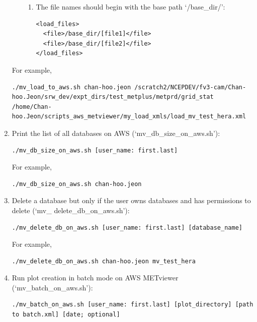 \documentclass[11pt,fleqn]{report}              %
\begin{document}
\begin{enumerate}
\begin{itemize}
\begin{enumerate}
\item The file names should begin with the base path `/base\_dir/':
\lstset{language=XML}   
\begin{lstlisting}[frame=trBL]
<load_files>
  <file>/base_dir/[file1]</file>
  <file>/base_dir/[file2]</file>
</load_files>
\end{lstlisting}

\end{enumerate}
\end{itemize}

For example,
\lstset{language=bash}   
\begin{lstlisting}[frame=trBL]
./mv_load_to_aws.sh chan-hoo.jeon /scratch2/NCEPDEV/fv3-cam/Chan-hoo.Jeon/srw_dev/expt_dirs/test_metplus/metprd/grid_stat /home/Chan-hoo.Jeon/scripts_aws_metviewer/my_load_xmls/load_mv_test_hera.xml
\end{lstlisting}

\item Print the list of all databases on AWS (`mv\_db\_size\_on\_aws.sh'):
\lstset{language=bash}   
\begin{lstlisting}[frame=trBL]
./mv_db_size_on_aws.sh [user_name: first.last]
\end{lstlisting}

For example,
\lstset{language=bash}   
\begin{lstlisting}[frame=trBL]
./mv_db_size_on_aws.sh chan-hoo.jeon
\end{lstlisting}


\item Delete a database but only if the user owns databases and has permissions to delete (`mv\_ delete\_db\_on\_aws.sh'):
\lstset{language=bash}   
\begin{lstlisting}[frame=trBL]
./mv_delete_db_on_aws.sh [user_name: first.last] [database_name]
\end{lstlisting}

For example,
\lstset{language=bash}   
\begin{lstlisting}[frame=trBL]
./mv_delete_db_on_aws.sh chan-hoo.jeon mv_test_hera
\end{lstlisting}


\item Run plot creation in batch mode on AWS METviewer (`mv\_batch\_on\_aws.sh'):
\lstset{language=bash}   
\begin{lstlisting}[frame=trBL]
./mv_batch_on_aws.sh [user_name: first.last] [plot_directory] [path to batch.xml] [date; optional]
\end{lstlisting}

\end{enumerate}
\end{document}
